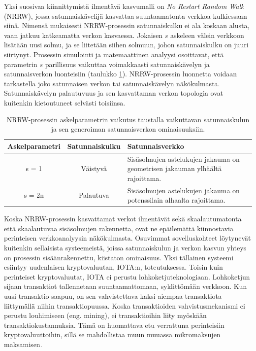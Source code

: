 \documentclass[finnish, 12pt, a4paper, sci, utf8, pdfa]{aaltothesis}
\begin{document}
Yksi suosivaa kiinnittymistä ilmentävä kasvumalli on \textit{No Restart Random Walk} (NRRW), jossa satunnaiskävelijä kasvattaa suuntaamatonta verkkoa kulkiessaan siinä. Nimensä 
mukaisesti NRRW-prosessin satunnaiskulku ei ala koskaan alusta, vaan jatkuu katkeamatta verkon kasvaessa. Jokaisen $ s $ askeleen välein verkkoon lisätään uusi solmu, ja se liitetään siihen solmuun, johon satunnaiskulku on juuri siirtynyt. Prosessin simulointi ja matemaattinen analyysi osoittavat, että parametrin $ s $ parillisuus vaikuttaa voimakkaasti satunnaiskävelyn ja satunnaisverkon luonteisiin (taulukko \ref{table:nrrw-character}). NRRW-prosessin luonnetta voidaan tarkastella joko satunnaisen verkon tai satunnaiskävelyn näkökulmasta. Satunnaiskävelyn palautuvuus ja sen kasvattaman verkon topologia ovat kuitenkin kietoutuneet selvästi toisiinsa. \cite{Iacobelli}

\begin{table}[htb]
   \begin{center}
   \begin{tabular}{|c|c|p{7.5cm}|}
   \hline
   \textbf{Askelparametri} & \textbf{Satunnaiskulku} & \textbf{Satunnaisverkko} \\ \hline
   s = 1          & Väistyvä        & Sisäsolmujen astelukujen jakauma on geometrisen jakauman ylhäältä rajoittama. \\ \hline
   s = 2n         & Palautuva       & Sisäsolmujen astelukujen jakauma on potenssilain alhaalta rajoittama. \\ \hline
   \end{tabular}
   \end{center}
   \caption{NRRW-prosessin askelparametrin vaikutus taustalla vaikuttavan satunnaiskulun ja sen generoiman satunnaisverkon ominaisuuksiin.}
   \label{table:nrrw-character}
\end{table}

Koska NRRW-prosessin kasvattamat verkot ilmentävät sekä skaalautumatonta että skaalautuvaa sisäsolmujen rakennetta, ovat ne epäilemättä kiinnostavia perinteisen verkkoanalyysin näkökulmasta. 
Osuvimmat sovelluskohteet löytynevät kuitenkin sellaisista systeemeistä, joissa satunnaiskulun ja verkon kasvun yhteys on prosessin sisäänrakennettu, kiistaton ominaisuus. Yksi tällainen
systeemi esiintyy uudenlaisen kryptovaluutan, IOTA:n, toteutuksessa. Toisin kuin perinteiset kryptovaluutat, IOTA ei perustu lohkoketjuteknologiaan. Lohkoketjun sijaan transaktiot 
tallennetaan suuntaamattomaan, syklittömään verkkoon. Kun uusi transaktio saapuu, on sen vahvistettava kaksi aiempaa transaktiota liittymällä niihin transaktiopuussa. Koska 
transaktioiden vahvistusmekanismi ei perustu louhimiseen (eng. mining), ei transaktioihin liity myöskään transaktiokustannuksia. Tämä on huomattava etu verrattuna perinteisiin
kryptovaluuttoihin, sillä se mahdollistaa muun muuassa mikromaksujen maksamisen. \cite{Popov-WP}
\end{document}
